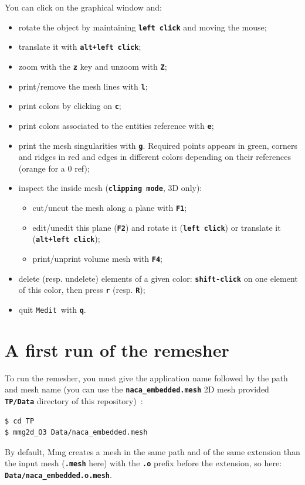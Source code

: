 \documentclass{article}
\newcommand{\ttb}[1]{\texttt{\textbf{#1}}}
\newcommand{\medit}{\texttt{Medit}}
\begin{document}
You can click on the graphical window and:
\begin{itemize}
\item rotate the object by maintaining \ttb{left click} and moving the mouse;
\item translate it with \ttb{alt+left click};
\item zoom with the \ttb{z} key and unzoom with \ttb{Z};
\item print/remove the mesh lines with \ttb{l};
\item print colors by clicking on \ttb{c};
\item print colors associated to the entities reference with \ttb{e};
\item print the mesh singularities with \ttb{g}. Required points
  appears in green, corners and ridges in red and edges in different colors
  depending on their references (orange for a 0 ref);
\item inspect the inside mesh (\ttb{clipping mode}, 3D only):
\begin{itemize}
\item cut/uncut the mesh along a plane with \ttb{F1};
\item edit/unedit this plane (\ttb{F2}) and rotate it (\ttb{left click}) or translate it (\ttb{alt+left click});
\item print/unprint volume mesh with \ttb{F4};
\end{itemize}
\item delete (resp. undelete) elements of a given color:
  \ttb{shift-click} on one element of this color, then press \ttb{r} (resp. \ttb{R});
\item quit \medit\ with \ttb{q}.
\end{itemize}

\section{A first run of the remesher}
To run the remesher, you must give the application name followed by
the path and mesh name (you can use the \ttb{naca\_embedded.mesh} 2D mesh
provided \ttb{TP/Data} directory of this repository)~:
\begin{lstlisting}[language=bash]
$ cd TP
$ mmg2d_O3 Data/naca_embedded.mesh
\end{lstlisting}

By default, Mmg creates a mesh in the same path and of the same
extension than the input mesh (\ttb{.mesh} here) with the \ttb{.o}
prefix before the extension, so here: \ttb{Data/naca\_embedded.o.mesh}.\\
\end{document}
